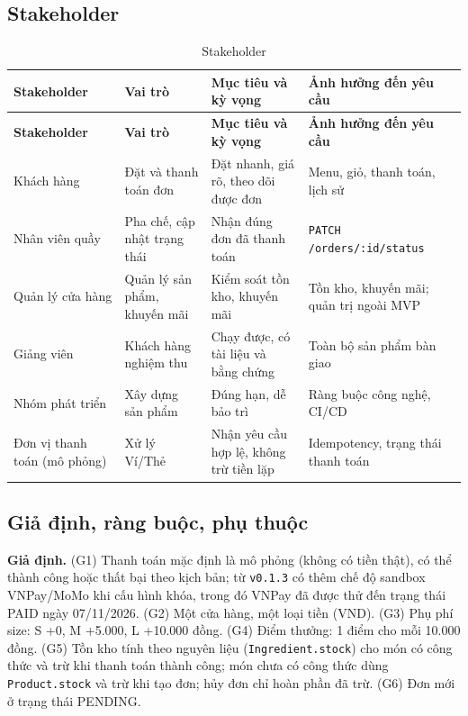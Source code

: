 \documentclass[a4paper]{article}
\begin{document}
\subsection{Stakeholder}\label{sec:se-stakeholder}
\begin{longtable}{@{}p{2.75cm}p{2.75cm}p{4.22cm}p{3.31cm}@{}}
\caption{Stakeholder}\label{tab:stakeholder}\\
\toprule \textbf{Stakeholder} & \textbf{Vai trò} & \textbf{Mục tiêu và kỳ vọng} & \textbf{Ảnh hưởng đến yêu cầu} \\ \midrule \endfirsthead
\toprule \textbf{Stakeholder} & \textbf{Vai trò} & \textbf{Mục tiêu và kỳ vọng} & \textbf{Ảnh hưởng đến yêu cầu} \\ \midrule \endhead
\bottomrule \endlastfoot
Khách hàng & Đặt và thanh toán đơn & Đặt nhanh, giá rõ, theo dõi được đơn & Menu, giỏ, thanh toán, lịch sử \\
Nhân viên quầy & Pha chế, cập nhật trạng thái & Nhận đúng đơn đã thanh toán & \texttt{PATCH /orders/:id/status} \\
Quản lý cửa hàng & Quản lý sản phẩm, khuyến mãi & Kiểm soát tồn kho, khuyến mãi & Tồn kho, khuyến mãi; quản trị ngoài MVP \\
Giảng viên & Khách hàng nghiệm thu & Chạy được, có tài liệu và bằng chứng & Toàn bộ sản phẩm bàn giao \\
Nhóm phát triển & Xây dựng sản phẩm & Đúng hạn, dễ bảo trì & Ràng buộc công nghệ, CI/CD \\
Đơn vị thanh toán (mô phỏng) & Xử lý Ví/Thẻ & Nhận yêu cầu hợp lệ, không trừ tiền lặp & Idempotency, trạng thái thanh toán \\
\end{longtable}

\subsection{Giả định, ràng buộc, phụ thuộc}\label{sec:se-rangbuoc}
\textbf{Giả định.} (G1) Thanh toán mặc định là mô phỏng (không có tiền thật), có thể thành công hoặc thất bại theo kịch bản; từ \texttt{v0.1.3} có thêm chế độ sandbox VNPay/MoMo khi cấu hình khóa, trong đó VNPay đã được thử đến trạng thái PAID ngày 07/11/2026. (G2) Một cửa hàng, một loại tiền (VND). (G3) Phụ phí size: S +0, M +5.000, L +10.000 đồng. (G4) Điểm thưởng: 1 điểm cho mỗi 10.000 đồng. (G5) Tồn kho tính theo nguyên liệu (\texttt{Ingredient.stock}) cho món có công thức và trừ khi thanh toán thành công; món chưa có công thức dùng \texttt{Product.stock} và trừ khi tạo đơn; hủy đơn chỉ hoàn phần đã trừ. (G6) Đơn mới ở trạng thái PENDING.
\end{document}
